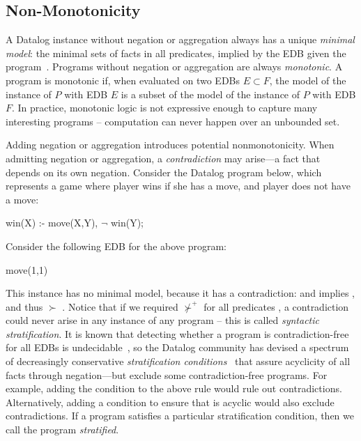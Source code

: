 \subsection{Non-Monotonicity}

A Datalog instance without negation or aggregation always has a unique {\em
minimal model}: the minimal sets of facts in all predicates, implied by the
EDB given the program~\cite{ullmanbook}.  Programs without negation or
aggregation are always {\em monotonic}.  A program is monotonic if, when
evaluated on two EDBs $E \subset F$, the model of the instance of $P$ with EDB
$E$ is a subset of the model of the instance of $P$ with EDB $F$.  In practice,
monotonic logic is not expressive enough to capture many interesting programs --
computation can never happen over an unbounded set.

Adding negation or aggregation introduces potential nonmonotonicity.  When
admitting negation or aggregation, a {\em
contradiction} may arise---a fact that depends on its own negation.  Consider
the Datalog program below, which represents a game where player 
wins if she has a move, and player  does not have a move:

\begin{Dedalus}
win(X) :- move(X,Y), \(\lnot\) win(Y);
\end{Dedalus}

\noindent{}Consider the following EDB for the above program:

\begin{Dedalus}
move(1,1)
\end{Dedalus}

This instance has no minimal model, because it has a contradiction:
 and  implies ,
and thus  $\succ$ .  Notice that if
we required  $\not\succ^+$  for all predicates
, a contradiction could never arise in any instance of any program
-- this is called {\em syntactic stratification}.  It is known that detecting
whether a program is contradiction-free for all EDBs is
undecidable~\cite{papa-yanna}, so the Datalog community has devised a spectrum
of decreasingly conservative {\em stratification conditions}~\cite{local-strat,
ross-syntactic, modular, weak-strat} that assure acyclicity of all facts
through negation---but exclude some contradiction-free programs. For example,
adding the condition  to the above rule would rule out
contradictions.  Alternatively, adding a condition to ensure that
 is acyclic would also exclude contradictions.  If a program
satisfies a particular stratification condition, then we call the program {\em
stratified}.

